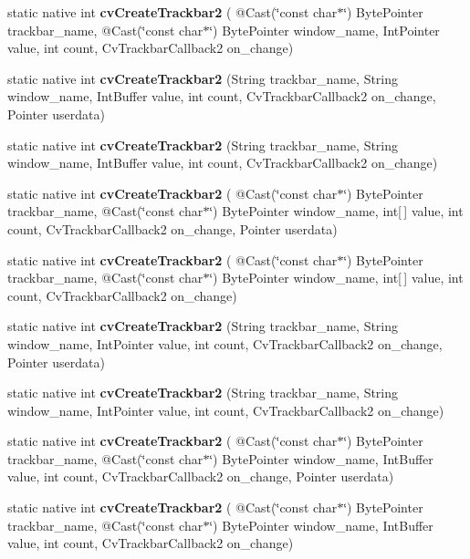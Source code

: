 \begin{DoxyCompactItemize}
\item 
static native int {\bfseries cv\+Create\+Trackbar2} ( @Cast(\char`\"{}const char$\ast$\char`\"{}) Byte\+Pointer trackbar\+\_\+name, @Cast(\char`\"{}const char$\ast$\char`\"{}) Byte\+Pointer window\+\_\+name, Int\+Pointer value, int count, Cv\+Trackbar\+Callback2 on\+\_\+change)
\item 
static native int {\bfseries cv\+Create\+Trackbar2} (String trackbar\+\_\+name, String window\+\_\+name, Int\+Buffer value, int count, Cv\+Trackbar\+Callback2 on\+\_\+change, Pointer userdata)
\item 
static native int {\bfseries cv\+Create\+Trackbar2} (String trackbar\+\_\+name, String window\+\_\+name, Int\+Buffer value, int count, Cv\+Trackbar\+Callback2 on\+\_\+change)
\item 
static native int {\bfseries cv\+Create\+Trackbar2} ( @Cast(\char`\"{}const char$\ast$\char`\"{}) Byte\+Pointer trackbar\+\_\+name, @Cast(\char`\"{}const char$\ast$\char`\"{}) Byte\+Pointer window\+\_\+name, int\mbox{[}$\,$\mbox{]} value, int count, Cv\+Trackbar\+Callback2 on\+\_\+change, Pointer userdata)
\item 
static native int {\bfseries cv\+Create\+Trackbar2} ( @Cast(\char`\"{}const char$\ast$\char`\"{}) Byte\+Pointer trackbar\+\_\+name, @Cast(\char`\"{}const char$\ast$\char`\"{}) Byte\+Pointer window\+\_\+name, int\mbox{[}$\,$\mbox{]} value, int count, Cv\+Trackbar\+Callback2 on\+\_\+change)
\item 
static native int {\bfseries cv\+Create\+Trackbar2} (String trackbar\+\_\+name, String window\+\_\+name, Int\+Pointer value, int count, Cv\+Trackbar\+Callback2 on\+\_\+change, Pointer userdata)
\item 
static native int {\bfseries cv\+Create\+Trackbar2} (String trackbar\+\_\+name, String window\+\_\+name, Int\+Pointer value, int count, Cv\+Trackbar\+Callback2 on\+\_\+change)
\item 
static native int {\bfseries cv\+Create\+Trackbar2} ( @Cast(\char`\"{}const char$\ast$\char`\"{}) Byte\+Pointer trackbar\+\_\+name, @Cast(\char`\"{}const char$\ast$\char`\"{}) Byte\+Pointer window\+\_\+name, Int\+Buffer value, int count, Cv\+Trackbar\+Callback2 on\+\_\+change, Pointer userdata)
\item 
static native int {\bfseries cv\+Create\+Trackbar2} ( @Cast(\char`\"{}const char$\ast$\char`\"{}) Byte\+Pointer trackbar\+\_\+name, @Cast(\char`\"{}const char$\ast$\char`\"{}) Byte\+Pointer window\+\_\+name, Int\+Buffer value, int count, Cv\+Trackbar\+Callback2 on\+\_\+change)

\end{DoxyCompactItemize}
